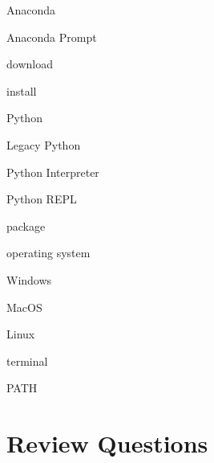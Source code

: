\documentclass{book}
\newenvironment{key_terms}{\begin{multicols}{3}}{\end{multicols}} %
\begin{document}
    
        \begin{key_terms}
        Anaconda

Anaconda Prompt

download

install

Python

Legacy Python

Python Interpreter

Python REPL

package

operating system

Windows

MacOS

Linux

terminal

PATH
        \end{key_terms}

    




    
        \hypertarget{review-questions}{%
\section{Review Questions}\label{review-questions}}
    
\end{document}
